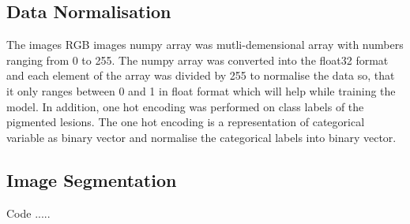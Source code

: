 \subsection{Data Normalisation}
The images RGB images numpy array was mutli-demensional array with numbers ranging from 0 to 255. The numpy array was 
converted into the float32 format and each element of the array was divided by 255 to normalise the data so, that 
it only ranges between 0 and 1 in float format which will help while training the model. In addition, one hot encoding 
was performed on class labels of the pigmented lesions. The one hot encoding is a representation of categorical variable 
as binary vector and normalise the categorical labels into binary vector.

\subsection{ Image Segmentation }
Code .....